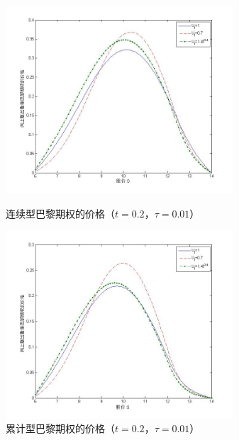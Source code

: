 \documentclass{ctexart} %
\begin{document}
\begin{figure}[H]
\begin{minipage}{0.48\linewidth}
\includegraphics[width=8.5cm]{code/t0.2.jpg}
\caption{连续型巴黎期权的价格（$t=0.2$，$\tau=0.01$）}
\end{minipage}
\begin{minipage}{0.48\linewidth}
\includegraphics[width=8.5cm]{code/tc0.2.jpg}
\caption{累计型巴黎期权的价格（$t=0.2$，$\tau=0.01$）}
\end{minipage}
\end{figure}
\end{document}
